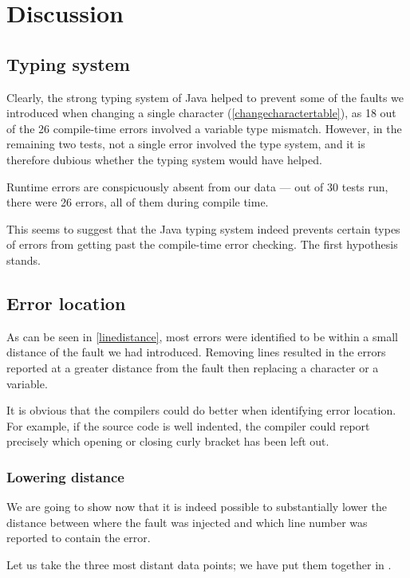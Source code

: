 \documentclass[10pt]{report}
\begin{document}
\chapter{Discussion}
\thispagestyle{fancy}

\section{Typing system}

Clearly, the strong typing system of Java helped to prevent some of the faults we introduced when changing a single character (\ref{changecharactertable}), as 18 out of the 26 compile-time errors involved a variable type mismatch.  However, in the remaining two tests, not a single error involved the type system, and it is therefore dubious whether the typing system would have helped.

Runtime errors are conspicuously absent from our data --- out of 30 tests run, there were 26 errors, all of them during compile time.

This seems to suggest that the Java typing system indeed prevents certain types of errors from getting past the compile-time error checking.  The first hypothesis stands.

\section{Error location}

As can be seen in \ref{linedistance}, most errors were identified to be within a small distance of the fault we had introduced.  Removing lines resulted in the errors reported at a greater distance from the fault then replacing a character or a variable.

It is obvious that the compilers could do better when identifying error location.  For example, if the source code is well indented, the compiler could report precisely which opening or closing curly bracket has been left out.

\subsection{Lowering distance}

We are going to show now that it is indeed possible to substantially lower the distance between where the fault was injected and which line number was reported to contain the error.

Let us take the three most distant data points; we have put them together in \cite{improvabledistance}.
\end{document}
